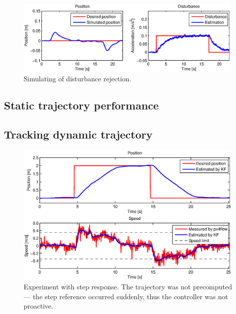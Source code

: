 \begin{figure}[H]
\centering
\includegraphics[width=0.99\textwidth]{fig/simulation4.eps}
\caption{Simulating of disturbance rejection.}
\label{fig:simulation_step_governor}
\end{figure}

\subsection{Static trajectory performance}

\subsection{Tracking dynamic trajectory}
\label{cap:dynamic_trajectory_tracking}

\begin{figure}[h]
\centering
\includegraphics[width=0.99\textwidth]{fig/experiment2_step.eps}
\caption{Experiment with step response. The trajectory was not precomputed --- the step reference occurred suddenly, thus the controller was not proactive.}
\label{fig:experiment_sine_1}
\end{figure}

